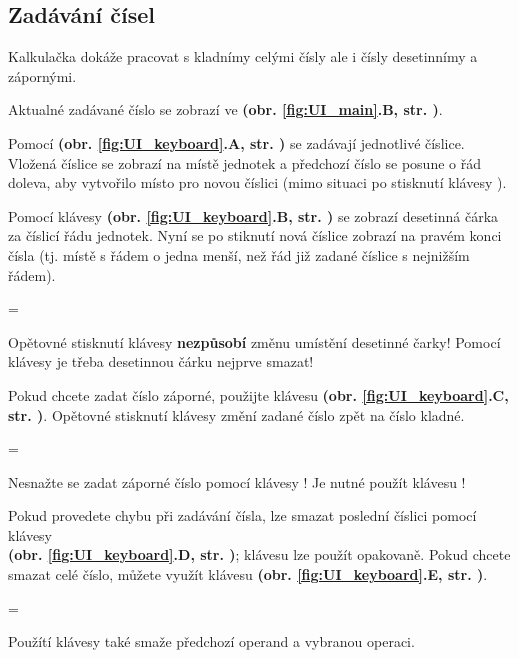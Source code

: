 \documentclass[a5paper,8pt,twoside]{extarticle}
\newenvironment{warningBox}
  {\par\begin{mdframed}[linewidth=1pt,linecolor=black]%
    \begin{list}{}{\leftmargin=1cm
                   \labelwidth=\leftmargin}\item[\Large\warning]}
  {\end{list}\end{mdframed}\par}
\newenvironment{prohibitBox}
  {\par\begin{mdframed}[linewidth=1pt,linecolor=black]%
    \begin{list}{}{\leftmargin=1cm
                   \labelwidth=\leftmargin}\item[\Large\noway]}
  {\end{list}\end{mdframed}\par}
\newcommand*\fref[2]{\textbf{(obr. \ref{#1}#2, str. \pageref{#1})}}
\begin{document}
    \subsection{Zadávání čísel}
    \label{sec:entering_numbers}
    Kalkulačka dokáže pracovat s kladnímy celými čísly ale i čísly desetinnímy a zápornými.

    Aktualné zadávané číslo se zobrazí ve  \fref{fig:UI_main}{.B}.

    Pomocí  \fref{fig:UI_keyboard}{.A} se zadávají jednotlivé číslice. Vložená číslice se zobrazí na místě jednotek a předchozí číslo se posune o řád doleva, aby vytvořilo místo pro novou číslici (mimo situaci po stisknutí klávesy ).

    Pomocí klávesy  \fref{fig:UI_keyboard}{.B} se zobrazí desetinná čárka za číslicí řádu jednotek. Nyní se po stiknutí  nová číslice zobrazí na pravém konci čísla (tj. místě s řádem o jedna menší, než řád již zadané číslice s nejnižším řádem).

    \begin{prohibitBox}
        Opětovné stisknutí klávesy  \textbf{nezpůsobí} změnu umístění desetinné čarky! Pomocí klávesy  je třeba desetinnou čá\-rku nejprve smazat!
    \end{prohibitBox}

    Pokud chcete zadat číslo záporné, použijte klávesu  \fref{fig:UI_keyboard}{.C}. Opětovné stisknutí klávesy změní zadané číslo zpět na číslo kladné.

    \begin{prohibitBox}
        Nesnažte se zadat záporné číslo pomocí klávesy ! Je nutné použít klávesu !
    \end{prohibitBox}

    Pokud provedete chybu při zadávání čísla, lze smazat poslední číslici pomocí klávesy \\ \fref{fig:UI_keyboard}{.D}; klávesu lze použít opakovaně. Pokud chcete smazat celé číslo, můžete využít klávesu  \fref{fig:UI_keyboard}{.E}.

    \begin{warningBox}
        Použítí klávesy  také smaže předchozí operand a vybranou operaci.
    \end{warningBox}
\end{document}
